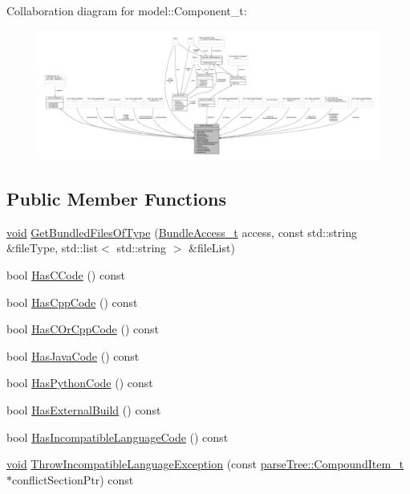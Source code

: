 Collaboration diagram for model\+:\+:Component\+\_\+t\+:
\nopagebreak
\begin{figure}[H]
\begin{center}
\leavevmode
\includegraphics[width=350pt]{structmodel_1_1_component__t__coll__graph}
\end{center}
\end{figure}
\subsection*{Public Member Functions}
\begin{DoxyCompactItemize}
\item 
\hyperlink{_t_e_m_p_l_a_t_e__cdef_8h_ac9c84fa68bbad002983e35ce3663c686}{void} \hyperlink{structmodel_1_1_component__t_abd3ff92a1aea52b001f06b5558cf6866}{Get\+Bundled\+Files\+Of\+Type} (\hyperlink{namespacemodel_a026dbfd7d63730bfdbca3403cd1d5d1d}{Bundle\+Access\+\_\+t} access, const std\+::string \&file\+Type, std\+::list$<$ std\+::string $>$ \&file\+List)
\item 
bool \hyperlink{structmodel_1_1_component__t_aa1ad16e5b026f654785c3c37db22d6c4}{Has\+C\+Code} () const 
\item 
bool \hyperlink{structmodel_1_1_component__t_a2766f79c7ca8160bea6c70597432e67f}{Has\+Cpp\+Code} () const 
\item 
bool \hyperlink{structmodel_1_1_component__t_a191c15f912d72d1fcd7c1f34941a582b}{Has\+C\+Or\+Cpp\+Code} () const 
\item 
bool \hyperlink{structmodel_1_1_component__t_a173efde62daf0e5d89ab0241a71dad4c}{Has\+Java\+Code} () const 
\item 
bool \hyperlink{structmodel_1_1_component__t_a8f024ce071f8d1a711f5dbfafff44dba}{Has\+Python\+Code} () const 
\item 
bool \hyperlink{structmodel_1_1_component__t_ae9c478dbb224d55313b8bf5718a967f2}{Has\+External\+Build} () const 
\item 
bool \hyperlink{structmodel_1_1_component__t_ab54269fefd54a94c248a053d98c5f0e0}{Has\+Incompatible\+Language\+Code} () const 
\item 
\hyperlink{_t_e_m_p_l_a_t_e__cdef_8h_ac9c84fa68bbad002983e35ce3663c686}{void} \hyperlink{structmodel_1_1_component__t_a9bffa1dd34224f043ae51de4f8f555d7}{Throw\+Incompatible\+Language\+Exception} (const \hyperlink{structparse_tree_1_1_compound_item__t}{parse\+Tree\+::\+Compound\+Item\+\_\+t} $\ast$conflict\+Section\+Ptr) const 
\end{DoxyCompactItemize}

